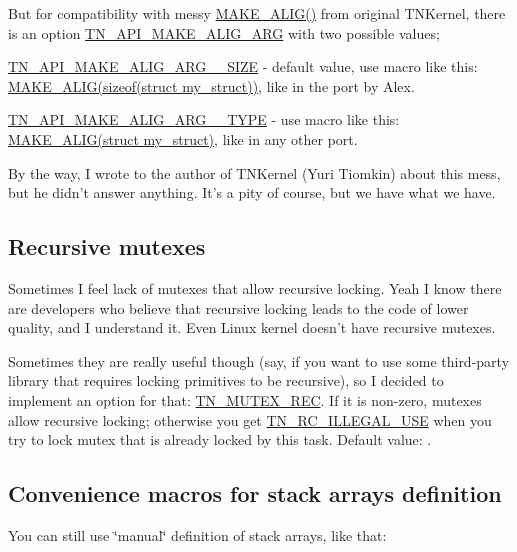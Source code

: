 But for compatibility with messy {\ttfamily \hyperlink{tn__oldsymbols_8h_aa42d2e6b5b7ff37bd485803fa2cb70a8}{M\+A\+K\+E\+\_\+\+A\+L\+I\+G()}} from original T\+N\+Kernel, there is an option {\ttfamily \hyperlink{tn__cfg__default_8h_a2a1148efc6a74131cc83ee50cbc386cd}{T\+N\+\_\+\+A\+P\+I\+\_\+\+M\+A\+K\+E\+\_\+\+A\+L\+I\+G\+\_\+\+A\+R\+G}} with two possible values;


\begin{DoxyItemize}
\item {\ttfamily \hyperlink{tn__common_8h_a4972bf0cbc72e51a7463cf7d786d2b64}{T\+N\+\_\+\+A\+P\+I\+\_\+\+M\+A\+K\+E\+\_\+\+A\+L\+I\+G\+\_\+\+A\+R\+G\+\_\+\+\_\+\+S\+I\+Z\+E}} -\/ default value, use macro like this\+: {\ttfamily \hyperlink{tn__oldsymbols_8h_aa42d2e6b5b7ff37bd485803fa2cb70a8}{M\+A\+K\+E\+\_\+\+A\+L\+I\+G(sizeof(struct my\+\_\+struct))}}, like in the port by Alex.
\item {\ttfamily \hyperlink{tn__common_8h_a04321413cf21754a05682b298df0493d}{T\+N\+\_\+\+A\+P\+I\+\_\+\+M\+A\+K\+E\+\_\+\+A\+L\+I\+G\+\_\+\+A\+R\+G\+\_\+\+\_\+\+T\+Y\+P\+E}} -\/ use macro like this\+: {\ttfamily \hyperlink{tn__oldsymbols_8h_aa42d2e6b5b7ff37bd485803fa2cb70a8}{M\+A\+K\+E\+\_\+\+A\+L\+I\+G(struct my\+\_\+struct)}}, like in any other port.
\end{DoxyItemize}

By the way, I wrote to the author of T\+N\+Kernel (Yuri Tiomkin) about this mess, but he didn't answer anything. It's a pity of course, but we have what we have.\hypertarget{tnkernel_diff_tnkernel_diff_mutex_rec}{}\subsection{Recursive mutexes}\label{tnkernel_diff_tnkernel_diff_mutex_rec}
Sometimes I feel lack of mutexes that allow recursive locking. Yeah I know there are developers who believe that recursive locking leads to the code of lower quality, and I understand it. Even Linux kernel doesn't have recursive mutexes.

Sometimes they are really useful though (say, if you want to use some third-\/party library that requires locking primitives to be recursive), so I decided to implement an option for that\+: {\ttfamily \hyperlink{tn__cfg__default_8h_a2557da78508c4241aceee92475df3581}{T\+N\+\_\+\+M\+U\+T\+E\+X\+\_\+\+R\+E\+C}}. If it is non-\/zero, mutexes allow recursive locking; otherwise you get {\ttfamily \hyperlink{tn__common_8h_aa43bd3da1ad4c1e61224b5f23b369876a2c83a60bf543df45b5045d6f7fbc7d0c}{T\+N\+\_\+\+R\+C\+\_\+\+I\+L\+L\+E\+G\+A\+L\+\_\+\+U\+S\+E}} when you try to lock mutex that is already locked by this task. Default value\+: {}.\hypertarget{tnkernel_diff_tnkernel_new_api__convenience_macros_stack}{}\subsection{Convenience macros for stack arrays definition}\label{tnkernel_diff_tnkernel_new_api__convenience_macros_stack}
You can still use \char`\"{}manual\char`\"{} definition of stack arrays, like that\+:


